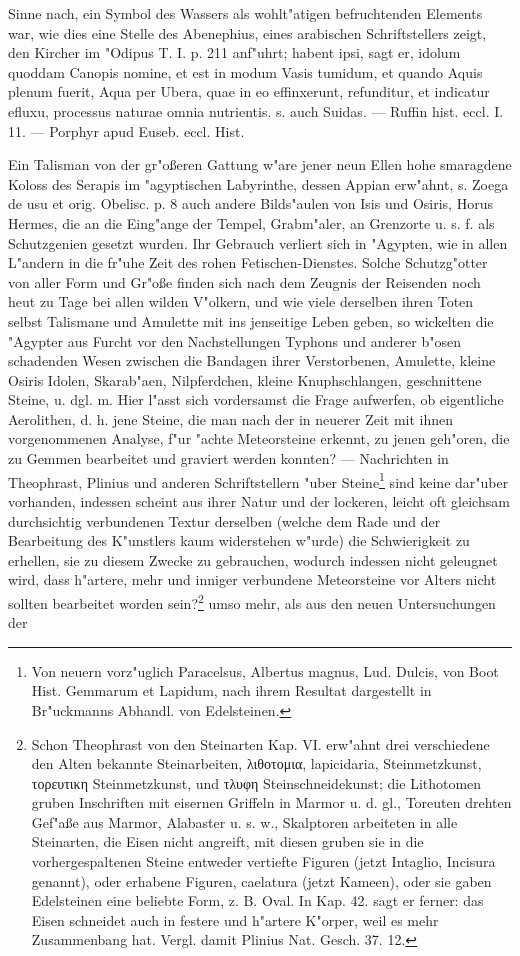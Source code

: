 \documentclass[a4paper, 11pt, oneside, polutonikogreek, german]{article}
\begin{document}
Sinne nach, ein Symbol des Wassers als wohlt"atigen befruchtenden Elements war, wie dies eine Stelle des Abenephius, eines arabischen Schriftstellers zeigt, den Kircher im "Odipus T. I. p. 211 anf"uhrt; habent ipsi, sagt er, idolum quoddam Canopis nomine, et est in modum Vasis tumidum, et quando Aquis plenum fuerit, Aqua per Ubera, quae in eo effinxerunt, refunditur, et indicatur efluxu, processus naturae omnia nutrientis. s. auch Suidas. --- Ruffin hist. eccl. I. 11. --- Porphyr apud Euseb. eccl. Hist.

Ein Talisman von der gr"oßeren Gattung w"are jener neun Ellen hohe smaragdene Koloss des Serapis im "agyptischen Labyrinthe, dessen Appian erw"ahnt, s. Zoega de usu et orig. Obelisc. p. 8 auch andere Bilds"aulen von Isis und Osiris, Horus Hermes, die an die Eing"ange der Tempel, Grabm"aler, an Grenzorte u. s. f. als Schutzgenien gesetzt wurden. Ihr Gebrauch verliert sich in "Agypten, wie in allen L"andern in die fr"uhe Zeit des rohen Fetischen-Dienstes. Solche Schutzg"otter von aller Form und Gr"oße finden sich nach dem Zeugnis der Reisenden noch heut zu Tage bei allen wilden V"olkern, und wie viele derselben ihren Toten selbst Talismane und Amulette mit ins jenseitige Leben geben, so wickelten die "Agypter aus Furcht vor den Nachstellungen Typhons und anderer b"osen schadenden Wesen zwischen die Bandagen ihrer Verstorbenen, Amulette, kleine Osiris Idolen, Skarab"aen, Nilpferdchen, kleine Knuphschlangen, geschnittene Steine, u. dgl. m. Hier l"asst sich vordersamst die Frage aufwerfen, ob eigentliche Aerolithen, d. h. jene Steine, die man nach der in neuerer Zeit mit ihnen vorgenommenen Analyse, f"ur "achte Meteorsteine erkennt, zu jenen geh"oren, die zu Gemmen bearbeitet und graviert werden konnten? --- Nachrichten in Theophrast, Plinius und anderen Schriftstellern "uber Steine\footnote{Von neuern vorz"uglich Paracelsus, Albertus magnus, Lud. Dulcis, von Boot Hist. Gemmarum et Lapidum, nach ihrem Resultat dargestellt in Br"uckmanns Abhandl. von Edelsteinen.} sind keine dar"uber vorhanden, indessen scheint aus ihrer Natur und der lockeren, leicht oft gleichsam durchsichtig verbundenen Textur derselben (welche dem Rade und der Bearbeitung des K"unstlers kaum widerstehen w"urde) die Schwierigkeit zu erhellen, sie zu diesem Zwecke zu gebrauchen, wodurch indessen nicht geleugnet wird, dass h"artere, mehr und inniger verbundene Meteorsteine vor Alters nicht sollten bearbeitet worden sein?\footnote{Schon Theophrast von den Steinarten Kap. VI. erw"ahnt drei verschiedene den Alten bekannte Steinarbeiten, λιθοτομια, lapicidaria, Steinmetzkunst, τορευτικη Steinmetzkunst, und τλυφη Steinschneidekunst; die Lithotomen gruben Inschriften mit eisernen Griffeln in Marmor u. d. gl., Toreuten drehten Gef"aße aus Marmor, Alabaster u. s. w., Skalptoren arbeiteten in alle Steinarten, die Eisen nicht angreift, mit diesen gruben sie in die vorhergespaltenen Steine entweder vertiefte Figuren (jetzt Intaglio, Incisura genannt), oder erhabene Figuren, caelatura (jetzt Kameen), oder sie gaben Edelsteinen eine beliebte Form, z. B. Oval. In Kap. 42. sagt er ferner: das Eisen schneidet auch in festere und h"artere K"orper, weil es mehr Zusammenbang hat. Vergl. damit Plinius Nat. Gesch. 37. 12.} umso mehr, als aus den neuen Untersuchungen der 
\end{document}

